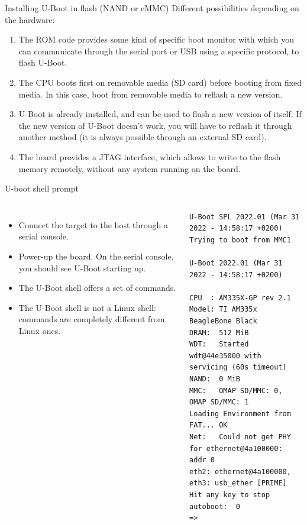 \begin{frame}{Installing U-Boot in flash (NAND or eMMC)}
  Different possibilities depending on the hardware:
  \begin{enumerate}
  \item The ROM code provides some kind of specific boot monitor with
    which you can communicate through the serial port or USB using a
    specific protocol, to flash U-Boot.
  \item The CPU boots first on removable media (SD card) before
    booting from fixed media. In this case, boot from
    removable media to reflash a new version.
  \item U-Boot is already installed, and can be used to flash a new
    version of itself. If the new version of U-Boot doesn't work,
    you will have to reflash it through another method (it is always
    possible through an external SD card).
  \item The board provides a JTAG interface, which allows to write to
    the flash memory remotely, without any system running on the
    board.
  \end{enumerate}
\end{frame}

\begin{frame}[fragile]{U-boot shell prompt}
  \begin{columns}
    \begin{itemize}
    \item Connect the target to the host through a serial console.
    \item Power-up the board. On the serial console, you should
      see U-Boot starting up.
    \item The U-Boot shell offers a set of commands.
    \item The U-Boot shell is not a Linux shell: commands are
      completely different from Linux ones.
    \end{itemize}
    \begin{block}{}
      {\tiny
\begin{verbatim}
U-Boot SPL 2022.01 (Mar 31 2022 - 14:58:17 +0200)
Trying to boot from MMC1

U-Boot 2022.01 (Mar 31 2022 - 14:58:17 +0200)

CPU  : AM335X-GP rev 2.1
Model: TI AM335x BeagleBone Black
DRAM:  512 MiB
WDT:   Started wdt@44e35000 with servicing (60s timeout)
NAND:  0 MiB
MMC:   OMAP SD/MMC: 0, OMAP SD/MMC: 1
Loading Environment from FAT... OK
Net:   Could not get PHY for ethernet@4a100000: addr 0
eth2: ethernet@4a100000, eth3: usb_ether [PRIME]
Hit any key to stop autoboot:  0
=>
\end{verbatim}
      }
    \end{block}
  \end{columns}
\end{frame}

